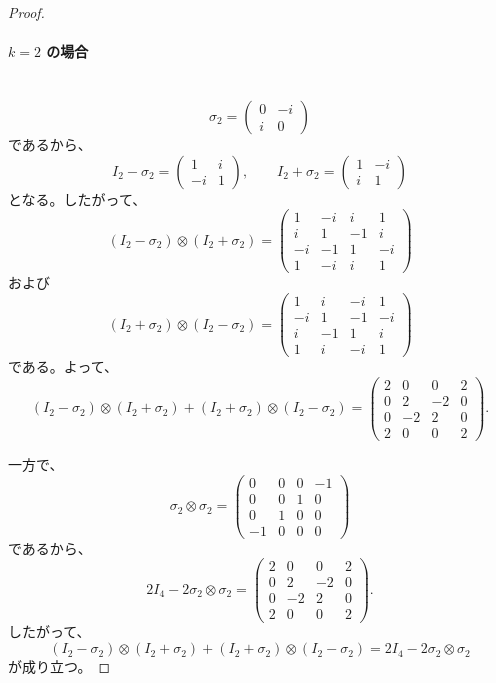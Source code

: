 \documentclass[dvipdfmx,a4paper]{jsarticle}
\theoremstyle{mystyle}
\begin{document}
\begin{proof}
\paragraph{\textbf{$k=2$ の場合}} \ \\
\[
\sigma_2=
\begin{pmatrix}
0 & -i\\
i & 0
\end{pmatrix}
\]
であるから、
\[
I_2-\sigma_2=
\begin{pmatrix}
1 & i\\
-i & 1
\end{pmatrix},
\qquad
I_2+\sigma_2=
\begin{pmatrix}
1 & -i\\
i & 1
\end{pmatrix}
\]
となる。したがって、
\[
(I_2-\sigma_2)\otimes(I_2+\sigma_2)
=
\begin{pmatrix}
1 & -i & i & 1\\
i & 1 & -1 & i\\
-i & -1 & 1 & -i\\
1 & -i & i & 1
\end{pmatrix}
\]
および
\[
(I_2+\sigma_2)\otimes(I_2-\sigma_2)
=
\begin{pmatrix}
1 & i & -i & 1\\
-i & 1 & -1 & -i\\
i & -1 & 1 & i\\
1 & i & -i & 1
\end{pmatrix}
\]
である。よって、
\[
(I_2-\sigma_2)\otimes(I_2+\sigma_2)
+(I_2+\sigma_2)\otimes(I_2-\sigma_2)
=
\begin{pmatrix}
2 & 0 & 0 & 2\\
0 & 2 & -2 & 0\\
0 & -2 & 2 & 0\\
2 & 0 & 0 & 2
\end{pmatrix}.
\]

一方で、
\[
\sigma_2\otimes\sigma_2
=
\begin{pmatrix}
0 & 0 & 0 & -1\\
0 & 0 & 1 & 0\\
0 & 1 & 0 & 0\\
-1 & 0 & 0 & 0
\end{pmatrix}
\]
であるから、
\[
2I_4-2\sigma_2\otimes\sigma_2
=
\begin{pmatrix}
2 & 0 & 0 & 2\\
0 & 2 & -2 & 0\\
0 & -2 & 2 & 0\\
2 & 0 & 0 & 2
\end{pmatrix}.
\]
したがって、
\[
(I_2-\sigma_2)\otimes(I_2+\sigma_2)
+(I_2+\sigma_2)\otimes(I_2-\sigma_2)
=
2I_4-2\sigma_2\otimes\sigma_2
\]
が成り立つ。


\end{proof}
\end{document}
